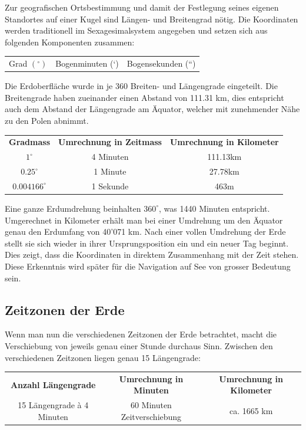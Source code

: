 \begin{refsection}
Zur geografischen Ortsbestimmung und damit der Festlegung seines eigenen Standortes auf einer Kugel sind Längen- und Breitengrad nötig. 
Die Koordinaten werden traditionell im Sexagesimalsystem angegeben und setzen sich aus folgenden Komponenten zusammen:

\begin{center}
\renewcommand{\arraystretch}{1.5}
\begin{tabular}{ccc}
Grad $(^{\circ})$ & Bogenminuten (`) & Bogensekunden (``)
\end{tabular}
\end{center}

Die Erdoberfläche wurde in je 360 Breiten- und Längengrade eingeteilt. Die Breitengrade haben zueinander einen Abstand von 111.31 km, dies entspricht auch dem Abstand der Längengrade am Äquator, welcher mit zunehmender Nähe zu den Polen abnimmt.

\begin{table}
\begin{center}
\renewcommand{\arraystretch}{2}
\begin{tabular}{ccc}
\textbf{Gradmass} & \textbf{Umrechnung in Zeitmass} & \textbf{Umrechnung in Kilometer}  \\
$1^{\circ}$ & 4 Minuten & 111.13km \\
$0.25^{\circ}$ & 1 Minute & 27.78km \\
$0.004166^{\circ}$ & 1 Sekunde & 463m 
\label {V7}
\end{tabular}
\end{center}
\end{table}

Eine ganze Erdumdrehung beinhalten $360 ^{\circ}$, was 1440 Minuten entspricht. Umgerechnet in Kilometer erhält man bei einer Umdrehung um den Äquator genau den Erdumfang von 40’071 km.
Nach einer vollen Umdrehung der Erde stellt sie sich wieder in ihrer Ursprungsposition ein und ein neuer Tag beginnt. Dies zeigt, dass die Koordinaten in direktem Zusammenhang mit der Zeit stehen. Diese Erkenntnis wird später für die Navigation auf See von grosser Bedeutung sein.


\subsection{Zeitzonen der Erde} \label{Zeitzonen} 
Wenn man nun die verschiedenen Zeitzonen der Erde betrachtet, macht die Verschiebung von jeweils genau einer Stunde durchaus Sinn.
Zwischen den verschiedenen Zeitzonen liegen genau 15 Längengrade:
\begin{center}
\renewcommand{\arraystretch}{1.5}
\begin{tabular}{ccc}
\textbf{Anzahl Längengrade} & \textbf{Umrechnung in Minuten} & \textbf{Umrechnung in Kilometer}  \\
15 Längengrade à 4 Minuten & 60 Minuten Zeitverschiebung & ca. 1665 km \\
\end{tabular}
\end{center}



\end{refsection}
